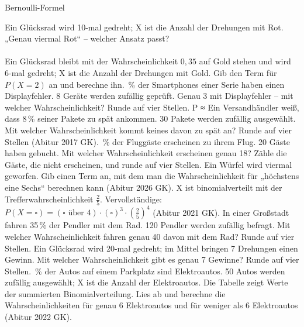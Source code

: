 \setcounter{aufgabe}{12}

\begin{aufgabe}{Bernoulli-Formel}
\begin{teile}
\teil Ein Glücksrad wird 10-mal gedreht; X ist die Anzahl der Drehungen mit Rot. „Genau viermal Rot“ – welcher Ansatz passt?  \\  \\ 
\teil Ein Glücksrad bleibt mit der Wahrscheinlichkeit $0{,}35$ auf Gold stehen und wird 6-mal gedreht; X ist die Anzahl der Drehungen mit Gold. Gib den Term für $P(X = 2)$ an und berechne ihn.
\,\% der Smartphones einer Serie haben einen Displayfehler. 8 Geräte werden zufällig geprüft. Genau 3 mit Displayfehler – mit welcher Wahrscheinlichkeit? Runde auf vier Stellen. P ≈ \leerfeld
\teil Ein Versandhändler weiß, dass 8\,\% seiner Pakete zu spät ankommen. 30 Pakete werden zufällig ausgewählt. Mit welcher Wahrscheinlichkeit kommt keines davon zu spät an? Runde auf vier Stellen \hfill (Abitur 2017 GK). \leerfeld
{}\,\% der Fluggäste erscheinen zu ihrem Flug. 20 Gäste haben gebucht. Mit welcher Wahrscheinlichkeit erscheinen genau 18? Zähle die Gäste, die nicht erscheinen, und runde auf vier Stellen. \leerfeld
\teil Ein Würfel wird viermal geworfen. Gib einen Term an, mit dem man die Wahrscheinlichkeit für „höchstens eine Sechs“ berechnen kann \hfill (Abitur 2026 GK).
\teil X ist binomialverteilt mit der Trefferwahrscheinlichkeit $\frac{2}{5}$. Vervollständige: $P(X = \square) = (\square \text{ über } 4) \cdot (\square)^3 \cdot \left(\frac{2}{5}\right)^4$ \hfill (Abitur 2021 GK).
\teil In einer Großstadt fahren 35\,\% der Pendler mit dem Rad. 120 Pendler werden zufällig befragt. Mit welcher Wahrscheinlichkeit fahren genau 40 davon mit dem Rad? Runde auf vier Stellen. \leerfeld
\teil Ein Glücksrad wird 20-mal gedreht; im Mittel bringen 7 Drehungen einen Gewinn. Mit welcher Wahrscheinlichkeit gibt es genau 7 Gewinne? Runde auf vier Stellen. \leerfeld
{}\,\% der Autos auf einem Parkplatz sind Elektroautos. 50 Autos werden zufällig ausgewählt; X ist die Anzahl der Elektroautos. Die Tabelle zeigt Werte der summierten Binomialverteilung. Lies ab und berechne die Wahrscheinlichkeiten für genau 6 Elektroautos und für weniger als 6 Elektroautos \hfill (Abitur 2022 GK).

\end{teile}
\end{aufgabe}

